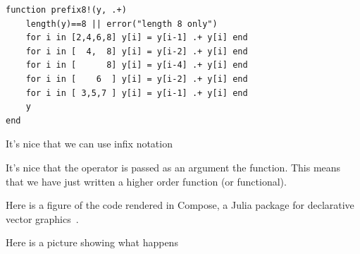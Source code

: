 \documentclass{sig-alternate}
\begin{document}
\begin{verbatim}
function prefix8!(y, .+)
    length(y)==8 || error("length 8 only")
    for i in [2,4,6,8] y[i] = y[i-1] .+ y[i] end
    for i in [  4,  8] y[i] = y[i-2] .+ y[i] end
    for i in [      8] y[i] = y[i-4] .+ y[i] end
    for i in [    6  ] y[i] = y[i-2] .+ y[i] end
    for i in [ 3,5,7 ] y[i] = y[i-1] .+ y[i] end
    y
end
\end{verbatim}

It's nice that we can use infix notation

It's nice that the operator is passed as an argument the function. This means that we have just written a higher order function (or functional).

Here is a figure of the code rendered in Compose, a Julia package for declarative vector graphics~\cite{Compose.jl}. 

Here is a picture showing what happens
\end{document}

